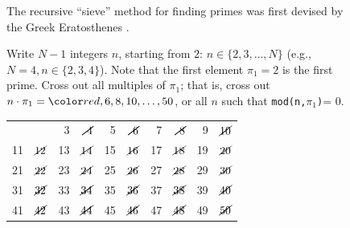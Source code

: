 \documentclass{ximera}
\begin{document}
\begin{figure}[htbp]

 \begin{tcolorbox}
The recursive ``sieve'' method for finding primes was first devised by the Greek Eratosthenes
 \citep{o2009genuine}.
 \end{tcolorbox}
\vspace*{1cm}

	\Be %
\item Write $N-1$ integers $n$, starting from $2$: $n \in \{2, 3, \dots, N\}$
 (e.g., $N=4, n \in \{2, 3, 4\}$).  Note that the first element $\pi_1=2$ is the first prime.
 Cross out all multiples of $\pi_1$; that is, cross out $n\cdot\pi_1 = {\red, 6, 8, 10, \dots, 50}$,
 or all $n$ such that \texttt{mod(n,$\pi_1$)}= 0.
 \begin{tcolorbox}
 \begin{center}
\begin{tabular}{r r r r r r r r r r}
     & {\bf \red 2} & 3 & $\cancel{\ 4}$ & 5 & $\cancel{\ 6}$ & 7 & $\cancel{\ 8}$ & 9 & $\cancel{10}$ \\
  11 & $\cancel{12}$ & 13 & $\cancel{14}$ & 15 & $\cancel{16}$ & 17 & $\cancel{18}$ & 19 & $\cancel{20}$ \\
  21 & $\cancel{22}$ & 23 & $\cancel{24}$ & 25 & $\cancel{26}$ & 27 & $\cancel{28}$ & 29 & $\cancel{30}$ \\
  31 & $\cancel{32}$ & 33 & $\cancel{34}$ & 35 & $\cancel{36}$ & 37 & $\cancel{38}$ & 39 & $\cancel{40}$ \\
  41 & $\cancel{42}$ & 43 & $\cancel{44}$ & 45 & $\cancel{46}$ & 47 & $\cancel{48}$ & 49 & $\cancel{50}$ \\
\end{tabular}
 \end{center}
 \end{tcolorbox}


\end{figure}
\end{document}
